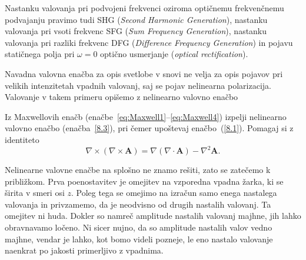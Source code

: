 \begin{remark}
Nastanku valovanja pri podvojeni frekvenci oziroma optičnemu frekvenčnemu podvajanju pravimo tudi
SHG ({\it Second Harmonic 
Generation}), 
nastanku valovanja pri vsoti frekvenc SFG
({\it Sum Frequency Generation}), 
nastanku valovanja pri razliki frekvenc DFG 
({\it Difference Frequency Generation}) in pojavu 
statičnega polja pri $\omega = 0$ optično usmerjanje
({\it optical rectification}).  
\end{remark}

Navadna valovna enačba za opis svetlobe v snovi  
ne velja za opis pojavov pri velikih 
intenzitetah vpadnih valovanj, saj se pojav nelinearna polarizacija. Valovanje 
v takem primeru opišemo z nelinearno valovno 
enačbo

\begin{definition}
Iz Maxwellovih enačb (enačbe~\ref{eq:Maxwell1}--\ref{eq:Maxwell4}) izpelji 
nelinearno valovno enačbo (enačba~\ref{8.3}), pri čemer upoštevaj enačbo~(\ref{8.1}). 
Pomagaj si z identiteto
$$
\nabla \times (\nabla \times \mathbf{A}) = \nabla (\nabla \cdot \mathbf{A}) 
- \nabla^2 \mathbf{A}.
$$
\end{definition} 

Nelinearne valovne enačbe na splošno ne znamo rešiti, zato se zatečemo k približkom.
Prva poenostavitev je omejitev na vzporedna vpadna žarka,
ki se širita v smeri osi $z$. Poleg tega se omejimo na izračun samo enega
nastalega valovanja in privzamemo, da je neodvisno od drugih nastalih valovanj.
Ta omejitev ni huda. Dokler so namreč amplitude nastalih valovanj majhne, 
jih lahko obravnavamo ločeno. Ni sicer nujno,
da so amplitude nastalih valov vedno majhne, vendar je lahko, kot bomo videli 
pozneje, le eno nastalo valovanje naenkrat po jakosti primerljivo z vpadnima. 

